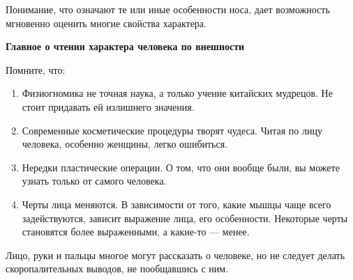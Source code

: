 Понимание, что означают те или иные особенности носа, дает возможность мгновенно оценить многие свойства характера.

\textbf{Главное о чтении характера человека по внешности}

Помните, что:
\begin{enumerate}
    \item Физиогномика не точная наука, а только учение китайских мудрецов. Не стоит придавать ей излишнего значения.
    \item Современные косметические процедуры творят чудеса. Читая по лицу человека, особенно женщины, легко ошибиться.
    \item Нередки пластические операции. О том, что они вообще были, вы можете узнать только от самого человека.
    \item Черты лица меняются. В зависимости от того, какие мышцы чаще всего задействуются, зависит выражение лица, его особенности. Некоторые черты становятся более выраженными, а какие-то — менее.
\end{enumerate}

Лицо, руки и пальцы многое могут рассказать о человеке, но не следует делать скоропалительных выводов, не пообщавшись с ним.

